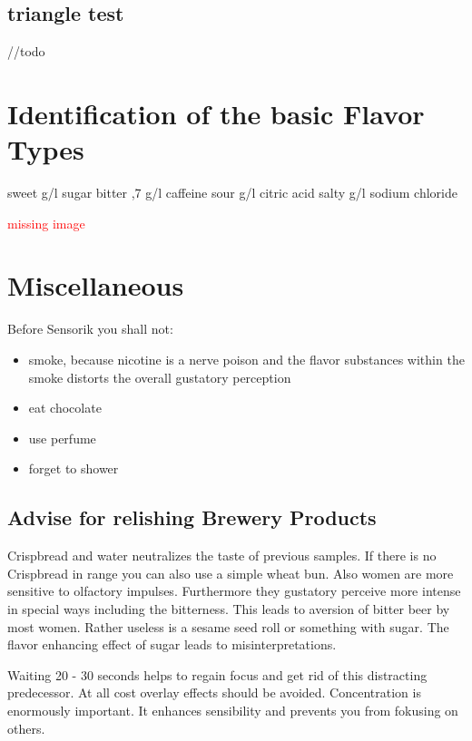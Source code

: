 \documentclass[]{scrartcl}
\begin{document}
\subsection{triangle test}
//todo


\section{Identification of the basic Flavor Types}
sweet  g/l sugar \newline
bitter ,7 g/l caffeine \newline
sour  g/l citric acid \newline
salty  g/l sodium chloride \newline

\textcolor{red}{missing image}


\newpage
\section{Miscellaneous}
Before Sensorik you shall not:
\begin{itemize}
  \item smoke, because nicotine is a nerve poison and the flavor substances within
  the smoke distorts the overall gustatory perception
  \item eat chocolate
  \item use perfume
  \item forget to shower
\end{itemize}

\subsection{Advise for relishing Brewery Products}
Crispbread and water neutralizes the taste of previous samples. If there is no Crispbread in range
you can also use a simple wheat bun.
Also women are more sensitive to olfactory impulses. Furthermore they gustatory perceive
more intense in special ways including the bitterness. This leads to aversion of bitter beer
by most women. Rather useless is a sesame seed roll or something with sugar.
The flavor enhancing effect of sugar leads to misinterpretations.

Waiting 20 - 30 seconds helps to regain focus and get rid of this distracting predecessor.
At all cost overlay effects should be avoided.
Concentration is enormously important. It enhances sensibility and prevents
you from fokusing on others.
\end{document}
